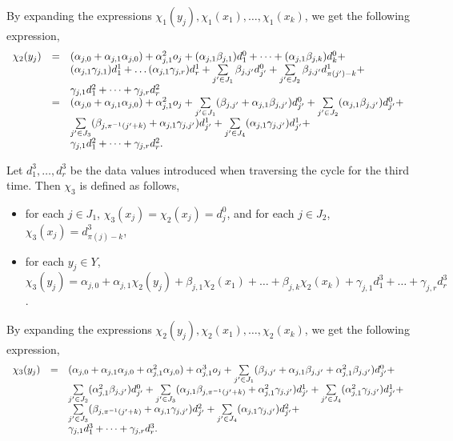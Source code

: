 \documentclass[runningheads,a4paper]{llncs}
\begin{document}
By expanding the expressions $\chi_1(y_j), \chi_1(x_1),\dots,\chi_1(x_k)$, we get the following expression,
\[
\begin{array}{l c l}
\chi_2(y_j)  & = & (\alpha_{j,0} + \alpha_{j,1} \alpha_{j,0}) + \alpha^2_{j,1} o_j + (\alpha_{j,1} \beta_{j,1}) d^0_{1} +\dots + (\alpha_{j,1}\beta_{j,k}) d^0_{k} + \\
& & (\alpha_{j,1} \gamma_{j,1}) d^1_1 + \dots (\alpha_{j,1} \gamma_{j,r}) d^1_r + \sum \limits_{j' \in J_1} \beta_{j,j'} d^0_{j'} + \sum \limits_{j' \in J_2} \beta_{j,j'} d^1_{\pi(j')-k} + \\
& &  \gamma_{j,1} d^2_1 + \dots + \gamma_{j,r} d^2_{r}\\
& = & (\alpha_{j,0} + \alpha_{j,1} \alpha_{j,0}) + \alpha^2_{j,1} o_j + \sum \limits_{j' \in J_1} (\beta_{j,j'} + \alpha_{j,1}  \beta_{j,j'}) d^0_{j'} + \sum \limits_{j' \in J_2} (\alpha_{j,1}\beta_{j,j'}) d^0_{j'} +\\
& &  \sum \limits_{j' \in J_3} (\beta_{j, \pi^{-1}(j'+k)}+\alpha_{j,1}\gamma_{j,j'}) d^1_{j'} + \sum \limits_{j' \in J_4} (\alpha_{j,1} \gamma_{j,j'}) d^1_{j'} +\\
& & \gamma_{j, 1} d^2_{1} + \dots + \gamma_{j,r} d^2_{r}.
\end{array} 
\]

Let $d^3_{1},\dots,d^3_{r}$ be the data values introduced when traversing the cycle for the third time. Then $\chi_3$ is defined as follows, 
\begin{itemize}
\item for each $j \in J_1$, $\chi_3(x_j)=\chi_2(x_j)=d^0_j$, and for each $j \in J_2$, $\chi_3(x_j) =d^3_{\pi(j)-k}$, 
%
\item for each $y_j \in Y$, $\chi_3(y_j) = \alpha_{j,0} + \alpha_{j,1} \chi_2(y_j) + \beta_{j,1} \chi_2(x_1) + \dots + \beta_{j,k} \chi_2(x_k) + \gamma_{j,1} d^3_{1} + \dots + \gamma_{j,r} d^3_{r}$.
\end{itemize}

By expanding the expressions $\chi_2(y_j), \chi_2(x_1),\dots,\chi_2(x_k)$, we get the following expression,
\[
\begin{array}{l c l}
\chi_3(y_j)  & = & (\alpha_{j,0} + \alpha_{j,1} \alpha_{j,0}+\alpha^2_{j,1} \alpha_{j,0}) + \alpha^3_{j,1} o_j + \sum \limits_{j' \in J_1} (\beta_{j,j'}+\alpha_{j,1}\beta_{j,j'} + \alpha^2_{j,1}  \beta_{j,j'}) d^0_{j'} + \\
& & \sum \limits_{j' \in J_2} (\alpha^2_{j,1}\beta_{j,j'}) d^0_{j'} +  \sum \limits_{j' \in J_3} (\alpha_{j,1}\beta_{j, \pi^{-1}(j'+k)}+\alpha^2_{j,1}\gamma_{j,j'}) d^1_{j'} + \sum \limits_{j' \in J_4} (\alpha^2_{j,1} \gamma_{j,j'}) d^1_{j'} +\\
& & \sum \limits_{j' \in J_3} (\beta_{j, \pi^{-1}(j'+k)}+\alpha_{j,1}\gamma_{j,j'}) d^2_{j'} + \sum \limits_{j' \in J_4} (\alpha_{j,1} \gamma_{j,j'}) d^2_{j'} +\\
& & \gamma_{j, 1} d^3_{1} + \dots + \gamma_{j,r} d^3_{r}.
\end{array} 
\]
\end{document}
